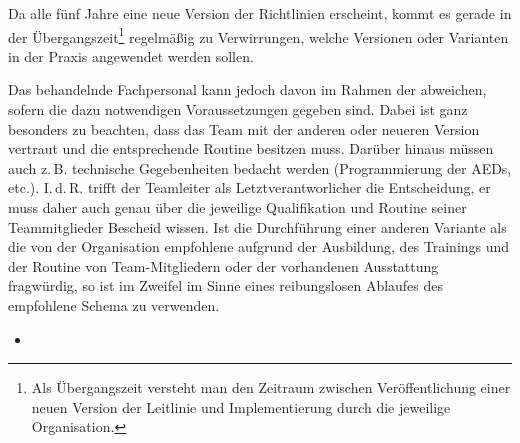 {%
Da alle fünf Jahre eine neue Version der Richtlinien
erscheint, kommt es gerade in der
Übergangszeit\footnote{Als Übergangszeit versteht man den
Zeitraum zwischen Veröffentlichung einer neuen Version der
Leitlinie und Implementierung durch die jeweilige
Organisation.} regelmäßig zu Verwirrungen, welche Versionen
oder Varianten in der Praxis angewendet werden sollen.

 Das
behandelnde Fachpersonal kann jedoch davon im Rahmen der
 abweichen, sofern die dazu
notwendigen Voraussetzungen gegeben sind. Dabei ist ganz
besonders zu beachten, dass das  Team mit der
anderen oder neueren Version vertraut und die entsprechende
Routine besitzen muss. Darüber hinaus müssen auch
z.\,B. technische Gegebenheiten bedacht werden
(Programmierung der AEDs, etc.). I.\,d.\,R. trifft der
Teamleiter als Letztverantworlicher die
Entscheidung, er muss daher auch genau über die jeweilige
Qualifikation und Routine seiner Teammitglieder Bescheid
wissen. Ist die Durchführung einer anderen Variante als die
von der Organisation empfohlene aufgrund der Ausbildung, des
Trainings und der Routine von Team-Mitgliedern oder der
vorhandenen Ausstattung fragwürdig, so ist im Zweifel im Sinne eines
reibungslosen Ablaufes des empfohlene Schema zu verwenden.


}{%
\begin{itemize}
   \item
\end{itemize}

}{}{}{}

\bigskip


